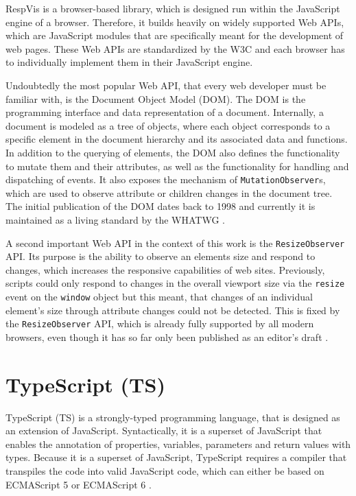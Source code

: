 RespVis is a browser-based library, which is designed run within the JavaScript engine of a browser. Therefore, it builds heavily on widely supported Web APIs, which are JavaScript modules that are specifically meant for the development of web pages. These Web APIs are standardized by the W3C and each browser has to individually implement them in their JavaScript engine.

Undoubtedly the most popular Web API, that every web developer must be familiar with, is the Document Object Model (DOM). The DOM is the programming interface and data representation of a document. Internally, a document is modeled as a tree of objects, where each object corresponds to a specific element in the document hierarchy and its associated data and functions. In addition to the querying of elements, the DOM also defines the functionality to mutate them and their attributes, as well as the functionality for handling and dispatching of events. It also exposes the mechanism of \lstinline{MutationObserver}s, which are used to observe attribute or children changes in the document tree. The initial publication of the DOM dates back to 1998 \parencite{DOM1} and currently it is maintained as a living standard by the WHATWG \parencite{DOM}.

A second important Web API in the context of this work is the \lstinline{ResizeObserver} API. Its purpose is the ability to observe an elements size and respond to changes, which increases the responsive capabilities of web sites. Previously, scripts could only respond to changes in the overall viewport size via the \lstinline{resize} event on the \lstinline{window} object but this meant, that changes of an individual element's size through attribute changes could not be detected. This is fixed by the \lstinline{ResizeObserver} API, which is already fully supported by all modern browsers, even though it has so far only been published as an editor's draft \parencite{ResizeObserver}.

\section{TypeScript (TS)}

TypeScript (TS) is a strongly-typed programming language, that is designed as an extension of JavaScript. Syntactically, it is a superset of JavaScript that enables the annotation of properties, variables, parameters and return values with types. Because it is a superset of JavaScript, TypeScript requires a compiler that transpiles the code into valid JavaScript code, which can either be based on ECMAScript 5 \parencite{ECMAScript5} or ECMAScript 6 \parencite{ECMAScript6}.

